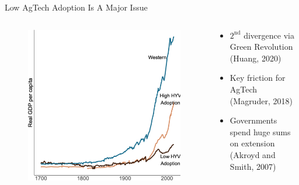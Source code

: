 \documentclass[
  ignorenonframetext,
]{beamer}
\providecommand{\tightlist}{%
  \setlength{\itemsep}{0pt}\setlength{\parskip}{0pt}}\usepackage{longtable,booktabs,array}
\begin{document}
\begin{frame}{Low AgTech Adoption Is A Major Issue}
\protect\hypertarget{low-agtech-adoption-is-a-major-issue}{}
\begin{columns}[T]
\begin{column}{0.55\textwidth}
\begin{figure}

\hfill{} \includegraphics{presentation2_files/figure-beamer/unnamed-chunk-2-1.svg}

\end{figure}
\end{column}

\begin{column}{0.35\textwidth}
\begin{itemize}[<+->]
\tightlist
\item
  \(2^{\text{nd}}\) divergence via Green Revolution (Huang, 2020)
\end{itemize}

\begin{itemize}[<+->]
\tightlist
\item
  Key friction for AgTech (Magruder, 2018)
\end{itemize}

\begin{itemize}[<+->]
\tightlist
\item
  Governments spend huge sums on extension (Akroyd and Smith, 2007)
\end{itemize}
\end{column}
\end{columns}
\end{frame}
\end{document}
